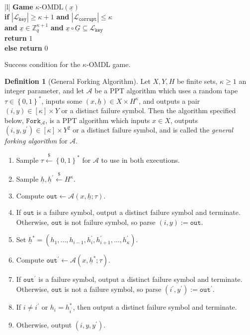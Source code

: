 \documentclass[11pt]{article}
\theoremstyle{definition}
\newtheorem{definition}[definition]{Definition}
\newcommand{\bitstrings}{\left\{0,1\right\}^*}
\newcommand{\Zq}{\mathbb{Z}_q}
\newcommand{\sample}{\overset{\$}{\leftarrow}}
\newcommand{\fork}{\texttt{Fork}}
\newcommand{\challengeKeySet}{\mathcal{L}_{\texttt{key}}}
\newcommand{\corruptedKeySet}{\mathcal{L}_{\texttt{corrupt}}}
\begin{document}
\begin{game}
    \centering
    \begin{tabular}{|l|}
    \hline
      {\textbf{Game} $\kappa\text{-OMDL}(\underline{x})$} \\
    \hline 
    \textbf{if} $\left|\challengeKeySet\right| \geq \kappa+1$  
    \textbf{and }  $\left|\corruptedKeySet\right| \leq \kappa$ \\
    \textbf{and} $\underline{x} \in \Zq^{\kappa+1}$ \textbf{and} $\underline{x} \circ \underline{G} \subseteq \challengeKeySet$\\
    \quad \quad \textbf{return} $1$ \\
    \textbf{else return} $0$ \\
    \hline
    \end{tabular}
    \caption{Success condition for the $\kappa$-OMDL game.}
    \label{game:OMDL}
\end{game}






\begin{definition}[General Forking Algorithm]\label{def:general_forking_algorithm}
Let $X, Y, H$ be finite sets, $\kappa \geq 1$ an integer parameter, and let $\mathcal{A}$ be a PPT algorithm which uses a random tape $\tau \in \bitstrings$, inputs some $(x, \underline{h}) \in X \times H^\kappa$, and  outputs a pair $(i, y) \in [\kappa] \times Y$ or a distinct failure symbol. Then the algorithm specified below, $\fork_{\mathcal{A}}$, is a PPT algorithm which inputs $x \in X$, outputs $(i, y, y^\prime) \in [\kappa] \times Y^2$ or a distinct failure symbol, and is called the \textit{general forking algorithm} for $\mathcal{A}$.
\begin{enumerate}
\item Sample $\tau \sample \bitstrings$ for $\mathcal{A}$ to use in both executions.
\item Sample $\underline{h}, \underline{h}^\prime \sample H^\kappa$.
\item Compute $\texttt{out} \leftarrow \mathcal{A}(x, \underline{h}; \tau)$.
\item If $\texttt{out}$ is a failure symbol, output a distinct failure symbol and terminate. Otherwise, $\texttt{out}$ is not failure symbol, so parse $(i, y) := \texttt{out}$.
\item Set $\underline{h}^* = (h_1, \ldots, h_{i-1}, h^\prime_i, h^\prime_{i+1}, \ldots, h^\prime_\kappa)$.
\item Compute $\texttt{out}^\prime \leftarrow \mathcal{A}(x, \underline{h}^*; \tau)$.
\item If $\texttt{out}^\prime$ is a failure symbol, output a distinct failure symbol and terminate. Otherwise, $\texttt{out}$ is not a failure symbol, so parse $(i^\prime, y^\prime) := \texttt{out}^\prime$.
\item If $i \neq i^\prime$ or $h_i = h_{i^\prime}^*$, then output a distinct failure symbol and terminate.
\item Otherwise, output $(i, y, y^\prime)$.
\end{enumerate}
\end{definition}
\end{document}
